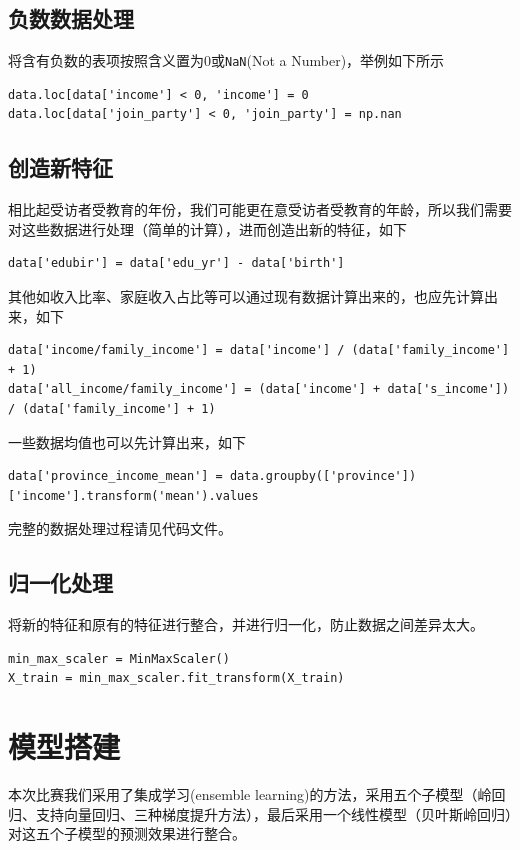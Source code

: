 \documentclass[logo,reportComp]{thesis}
\begin{document}
\subsection{负数数据处理}
将含有负数的表项按照含义置为0或\verb'NaN'(Not a Number)，举例如下所示
\begin{lstlisting}
data.loc[data['income'] < 0, 'income'] = 0
data.loc[data['join_party'] < 0, 'join_party'] = np.nan
\end{lstlisting}

\subsection{创造新特征}
相比起受访者受教育的年份，我们可能更在意受访者受教育的年龄，所以我们需要对这些数据进行处理（简单的计算），进而创造出新的特征，如下
\begin{lstlisting}
data['edubir'] = data['edu_yr'] - data['birth']
\end{lstlisting}

其他如收入比率、家庭收入占比等可以通过现有数据计算出来的，也应先计算出来，如下
\begin{lstlisting}
data['income/family_income'] = data['income'] / (data['family_income'] + 1)
data['all_income/family_income'] = (data['income'] + data['s_income']) / (data['family_income'] + 1)
\end{lstlisting}

一些数据均值也可以先计算出来，如下
\begin{lstlisting}
data['province_income_mean'] = data.groupby(['province'])['income'].transform('mean').values
\end{lstlisting}

完整的数据处理过程请见代码文件。

\subsection{归一化处理}
将新的特征和原有的特征进行整合，并进行归一化，防止数据之间差异太大。
\begin{lstlisting}
min_max_scaler = MinMaxScaler()
X_train = min_max_scaler.fit_transform(X_train)
\end{lstlisting}

\section{模型搭建}
本次比赛我们采用了集成学习(ensemble learning)的方法，采用五个子模型（岭回归、支持向量回归、三种梯度提升方法），最后采用一个线性模型（贝叶斯岭回归）对这五个子模型的预测效果进行整合。
\end{document}
